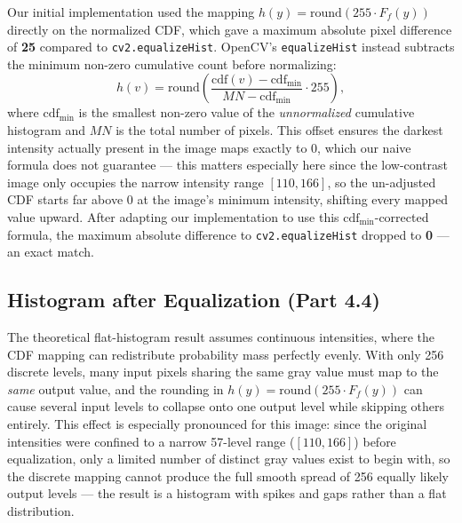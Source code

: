 \documentclass[11pt]{article}
\begin{document}
Our initial implementation used the mapping $h(y) = \text{round}(255 \cdot
F_f(y))$ directly on the normalized CDF, which gave a maximum absolute
pixel difference of \textbf{25} compared to \texttt{cv2.equalizeHist}.
OpenCV's \texttt{equalizeHist} instead subtracts the minimum non-zero
cumulative count before normalizing:
\[
h(v) = \text{round}\!\left(\frac{\text{cdf}(v) - \text{cdf}_{\min}}{MN - \text{cdf}_{\min}} \cdot 255\right),
\]
where $\text{cdf}_{\min}$ is the smallest non-zero value of the
\emph{unnormalized} cumulative histogram and $MN$ is the total number of
pixels. This offset ensures the darkest intensity actually present in the
image maps exactly to 0, which our naive formula does not guarantee ---
this matters especially here since the low-contrast image only occupies
the narrow intensity range $[110, 166]$, so the un-adjusted CDF starts far
above 0 at the image's minimum intensity, shifting every mapped value
upward. After adapting our implementation to use this $\text{cdf}_{\min}$-corrected
formula, the maximum absolute difference to \texttt{cv2.equalizeHist}
dropped to \textbf{0} --- an exact match.

\subsection{Histogram after Equalization (Part 4.4)}

The theoretical flat-histogram result assumes continuous intensities,
where the CDF mapping can redistribute probability mass perfectly evenly.
With only 256 discrete levels, many input pixels sharing the same gray
value must map to the \emph{same} output value, and the rounding in
$h(y) = \text{round}(255 \cdot F_f(y))$ can cause several input levels to
collapse onto one output level while skipping others entirely. This effect
is especially pronounced for this image: since the original intensities
were confined to a narrow 57-level range ($[110,166]$) before equalization,
only a limited number of distinct gray values exist to begin with, so the
discrete mapping cannot produce the full smooth spread of 256 equally
likely output levels --- the result is a histogram with spikes and gaps
rather than a flat distribution.
\end{document}
